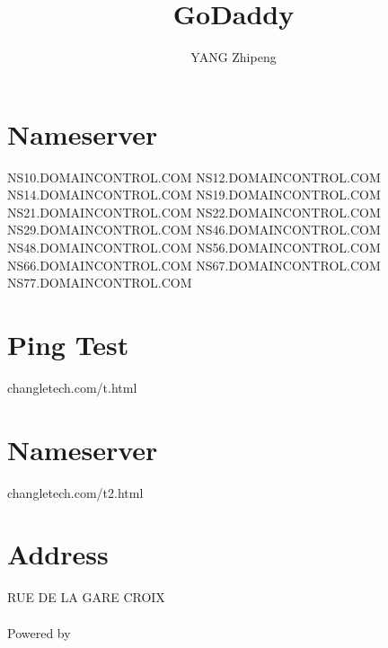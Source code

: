 \documentclass[UTF8]{ctexart}
\title{GoDaddy}
\author{YANG Zhipeng}
\begin{document}
\maketitle
\thispagestyle{empty}
\section{Nameserver}
\noindent
NS10.DOMAINCONTROL.COM NS12.DOMAINCONTROL.COM\\
NS14.DOMAINCONTROL.COM NS19.DOMAINCONTROL.COM\\
NS21.DOMAINCONTROL.COM NS22.DOMAINCONTROL.COM\\
NS29.DOMAINCONTROL.COM NS46.DOMAINCONTROL.COM\\
NS48.DOMAINCONTROL.COM NS56.DOMAINCONTROL.COM\\
NS66.DOMAINCONTROL.COM NS67.DOMAINCONTROL.COM\\
NS77.DOMAINCONTROL.COM
\section{Ping Test}
\noindent
changletech.com/t.html
\section{Nameserver}
\noindent
changletech.com/t2.html
\section{Address}
 RUE DE LA GARE CROIX
\paragraph{}
Powered by \XeLaTeX{}
\end{document}
